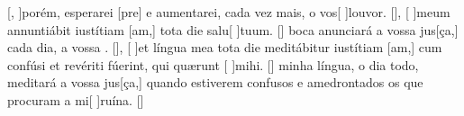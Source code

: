 {    {[, ]{po}rém, esperarei [pre] e aumentarei, cada vez mais, o vos[ ]{lou}{vor}. [\LinkPT]},
  {[ ]{me}um annuntiábit iustítiam [am,] tota die salu[ ]{tu}um. [\LinkLA]}%
    { boca anunciará a vossa jus[ça,] cada dia, a vossa . [\LinkPT]},
  {[ ]{et} língua mea tota die meditábitur iustítiam [am,] cum confúsi et revériti fúerint, qui quærunt [ ]{mi}hi. [\LinkLA]}%
    { minha língua, o dia todo, meditará a vossa jus[ça,] quando estiverem confusos e amedrontados os que procuram a mi[ ]{ru}{í}na. [\LinkPT]}
}